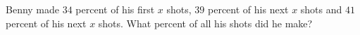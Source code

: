 Benny made \(34\) percent of his first \(x\) shots, \(39\) percent of his next \(x\) shots and \(41\) percent of his next \(x\) shots. What percent of all his shots did he make?
